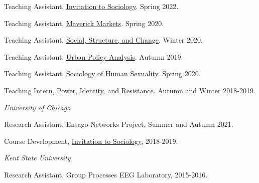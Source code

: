 \documentclass[11pt,article,oneside]{memoir}
\begin{document}
\ind Teaching Assistant, \underline{Invitation to Sociology}. Spring 2022.

\ind Teaching Assistant, \underline{Maverick Markets}. Spring 2020.

\ind Teaching Assistant, \underline{Social, Structure, and Change}. Winter 2020.

\ind Teaching Assistant, \underline{Urban Policy Analysis}. Autumn 2019.

\ind Teaching Assistant, \underline{Sociology of Human Sexuality}. Spring 2020.

\ind Teaching Intern, \underline{Power, Identity, and Resistance}. Autumn and Winter 2018-2019.

\bigskip
\newpage

\medskip
\noindent\emph{University of Chicago \vspace{0.01in}}

\ind Research Assistant, Ensago-Networks Project, Summer and Autumn 2021. \vspace{0.05in}

\ind Course Development, \underline{Invitation to Sociology}, 2018-2019. \vspace{0.05in}

\smallskip
\noindent\emph{Kent State University \vspace{0.01in}}

\ind Research Assistant, Group Processes EEG Laboratory, 2015-2016. \vspace{0.1in}

\normalsize

\bigskip

\medskip



\end{document}
